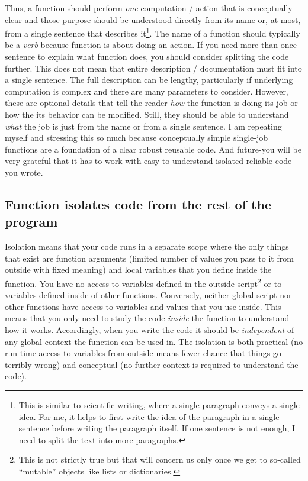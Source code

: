 \documentclass[
]{book}
\begin{document}
Thus, a function should perform \emph{one} computation / action that is conceptually clear and those purpose should be understood directly from its name or, at most, from a single sentence that describes it\footnote{This is similar to scientific writing, where a single paragraph conveys a single idea. For me, it helps to first write the idea of the paragraph in a single sentence before writing the paragraph itself. If one sentence is not enough, I need to split the text into more paragraphs.}. The name of a function should typically be a \emph{verb} because function is about doing an action. If you need more than once sentence to explain what function does, you should consider splitting the code further. This does not mean that entire description / documentation must fit into a single sentence. The full description can be lengthy, particularly if underlying computation is complex and there are many parameters to consider. However, these are optional details that tell the reader \emph{how} the function is doing its job or how the its behavior can be modified. Still, they should be able to understand \emph{what} the job is just from the name or from a single sentence. I am repeating myself and stressing this so much because conceptually simple single-job functions are a foundation of a clear robust reusable code. And future-you will be very grateful that it has to work with easy-to-understand isolated reliable code you wrote.

\hypertarget{function-isolates-code-from-the-rest-of-the-program}{%
\subsection{Function isolates code from the rest of the program}\label{function-isolates-code-from-the-rest-of-the-program}}

Isolation means that your code runs in a separate scope where the only things that exist are function arguments (limited number of values you pass to it from outside with fixed meaning) and local variables that you define inside the function. You have no access to variables defined in the outside script\footnote{This is not strictly true but that will concern us only once we get to so-called ``mutable'' objects like lists or dictionaries.} or to variables defined inside of other functions. Conversely, neither global script nor other functions have access to variables and values that you use inside. This means that you only need to study the code \emph{inside} the function to understand how it works. Accordingly, when you write the code it should be \emph{independent} of any global context the function can be used in. The isolation is both practical (no run-time access to variables from outside means fewer chance that things go terribly wrong) and conceptual (no further context is required to understand the code).
\end{document}
